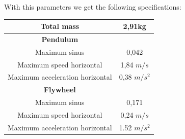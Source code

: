 With this parameters we get the following specifications:
\begin{center}
	\begin{tabular}{ |c|c| } 
	 \hline
	 Total mass & 2,91kg\\
	 \hline
	 \textbf{Pendulum} \\
	 \hline
	 Maximum sinus & 0,042\\
	 \hline
	 Maximum speed horizontal & 1,84 $m/s$\\
	 \hline
	 Maximum acceleration horizontal & 0,38 $m/s^2$\\
	 \hline
	 \textbf{Flywheel} \\
	 \hline
	 Maximum sinus & 0,171\\
	 \hline
	 Maximum speed horizontal & 0,24 $m/s$\\
	 \hline
	 Maximum acceleration horizontal & 1.52 $m/s^2$\\
	 \hline
	\end{tabular}
\end{center}